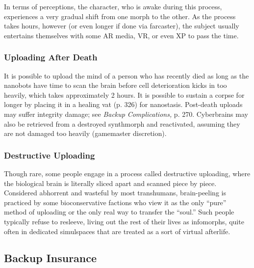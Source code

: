 In terms of perceptions, the character, who is awake 
during this process, experiences a very gradual shift 
from one morph to the other. As the process takes 
hours, however (or even longer if done via farcaster), 
the subject usually entertains themselves with some 
AR media, VR, or even XP to pass the time.

\subsubsection{Uploading After Death}

It is possible to upload the mind of a person who 
has recently died as long as the nanobots have time 
to scan the brain before cell deterioration kicks in 
too heavily, which takes approximately 2 hours. It 
is possible to sustain a corpse for longer by placing 
it in a healing vat (p. 326) for nanostasis. Post-death 
uploads may suffer integrity damage; see \textit{Backup }
\textit{Complications,} p. 270.
Cyberbrains may also be retrieved from a destroyed 
synthmorph and reactivated, assuming they are not 
damaged too heavily (gamemaster discretion).

\subsubsection{Destructive Uploading}

Though rare, some people engage in a process called 
destructive uploading, where the biological brain is literally
sliced apart and scanned piece by piece. Considered
abhorrent and wasteful by most transhumans, brain-peeling
is practiced by some bioconservative factions
who view it as the only ``pure'' method of uploading 
or the only real way to transfer the ``soul.'' Such people 
typically refuse to resleeve, living out the rest of their 
lives as infomorphs, quite often in dedicated simulspaces 
that are treated as a sort of virtual afterlife.

\subsection{Backup Insurance}

